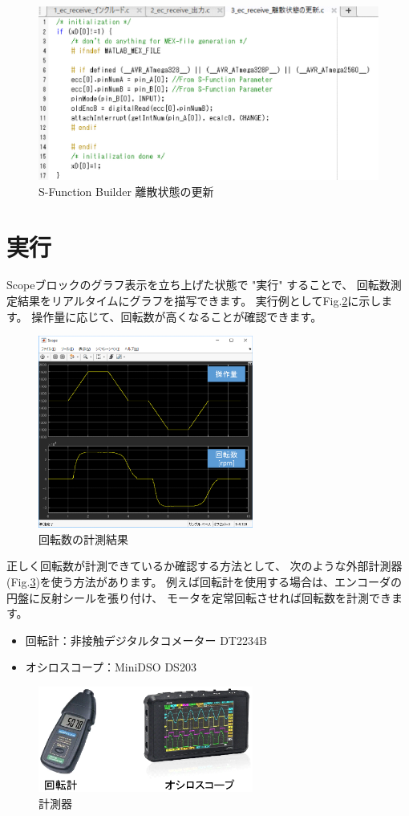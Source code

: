\begin{figure}[htbp]
    \centering
    \includegraphics[width=320pt]{fig/fig310.eps}
    \caption{S-Function Builder 離散状態の更新}
    \label{fig310}
\end{figure}  


\clearpage
\section{実行}\label{ux811aux69cbux6210}

Scopeブロックのグラフ表示を立ち上げた状態で "実行" することで、
回転数測定結果をリアルタイムにグラフを描写できます。
実行例としてFig.\ref{fig311}に示します。
操作量に応じて、回転数が高くなることが確認できます。
\begin{figure}[htbp]
    \centering
    \includegraphics[width=200pt]{fig/fig311.eps}
    \caption{回転数の計測結果}
    \label{fig311}
\end{figure}

正しく回転数が計測できているか確認する方法として、
次のような外部計測器(Fig.\ref{fig312})を使う方法があります。
例えば回転計を使用する場合は、エンコーダの円盤に反射シールを張り付け、
モータを定常回転させれば回転数を計測できます。

\begin{itemize}
    \tightlist
    \item
    回転計：非接触デジタルタコメーター DT2234B
    \item
    オシロスコープ：MiniDSO DS203
    \end{itemize}

\begin{figure}[htbp]
    \centering
    \includegraphics[width=200pt]{fig/fig312.eps}
    \caption{計測器}
    \label{fig312}
\end{figure}